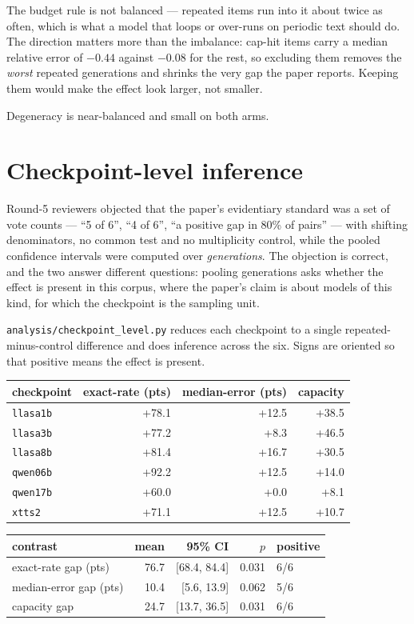 \documentclass[11pt]{article}
\begin{document}
The budget rule is not balanced --- repeated items run into it about twice as
often, which is what a model that loops or over-runs on periodic text should do.
The direction matters more than the imbalance: cap-hit items carry a median
relative error of $-0.44$ against $-0.08$ for the rest, so excluding them removes
the \emph{worst} repeated generations and shrinks the very gap the paper reports.
Keeping them would make the effect look larger, not smaller.

Degeneracy is near-balanced and small on both arms.

\section{Checkpoint-level inference}
\label{sec:s11}

Round-5 reviewers objected that the paper's evidentiary standard was a set of
vote counts --- ``5 of 6'', ``4 of 6'', ``a positive gap in 80\% of pairs'' ---
with shifting denominators, no common test and no multiplicity control, while the
pooled confidence intervals were computed over \emph{generations}. The objection
is correct, and the two answer different questions: pooling generations asks
whether the effect is present in this corpus, where the paper's claim is about
models of this kind, for which the checkpoint is the sampling unit.

\texttt{analysis/checkpoint\_level.py} reduces each checkpoint to a single
repeated-minus-control difference and does inference across the six. Signs are
oriented so that positive means the effect is present.

\begin{center}
\begin{tabular}{lrrr}
\toprule
checkpoint & exact-rate (pts) & median-error (pts) & capacity \\
\midrule
\texttt{llasa1b} & +78.1 & +12.5 & +38.5 \\
\texttt{llasa3b} & +77.2 & +8.3 & +46.5 \\
\texttt{llasa8b} & +81.4 & +16.7 & +30.5 \\
\texttt{qwen06b} & +92.2 & +12.5 & +14.0 \\
\texttt{qwen17b} & +60.0 & +0.0 & +8.1 \\
\texttt{xtts2} & +71.1 & +12.5 & +10.7 \\
\bottomrule
\end{tabular}
\end{center}

\begin{center}
\begin{tabular}{lrrrl}
\toprule
contrast & mean & 95\% CI & $p$ & positive \\
\midrule
exact-rate gap (pts) & 76.7 & [68.4, 84.4] & 0.031 & 6/6 \\
median-error gap (pts) & 10.4 & [5.6, 13.9] & 0.062 & 5/6 \\
capacity gap & 24.7 & [13.7, 36.5] & 0.031 & 6/6 \\
\bottomrule
\end{tabular}
\end{center}
\end{document}
